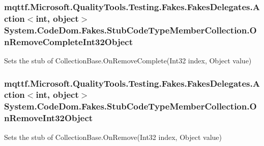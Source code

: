 \hypertarget{class_system_1_1_code_dom_1_1_fakes_1_1_stub_code_type_member_collection_a66573f67624ca9a5a2daddce894c0578}{
\subsubsection[{On\-Remove\-Complete\-Int32\-Object}]{\setlength{\rightskip}{0pt plus 5cm}mqttf.\-Microsoft.\-Quality\-Tools.\-Testing.\-Fakes.\-Fakes\-Delegates.\-Action$<$int, object$>$ System.\-Code\-Dom.\-Fakes.\-Stub\-Code\-Type\-Member\-Collection.\-On\-Remove\-Complete\-Int32\-Object}}\label{class_system_1_1_code_dom_1_1_fakes_1_1_stub_code_type_member_collection_a66573f67624ca9a5a2daddce894c0578}


Sets the stub of Collection\-Base.\-On\-Remove\-Complete(\-Int32 index, Object value)

\hypertarget{class_system_1_1_code_dom_1_1_fakes_1_1_stub_code_type_member_collection_a02981116075da1f75d5d2f35b8fab375}{
\subsubsection[{On\-Remove\-Int32\-Object}]{\setlength{\rightskip}{0pt plus 5cm}mqttf.\-Microsoft.\-Quality\-Tools.\-Testing.\-Fakes.\-Fakes\-Delegates.\-Action$<$int, object$>$ System.\-Code\-Dom.\-Fakes.\-Stub\-Code\-Type\-Member\-Collection.\-On\-Remove\-Int32\-Object}}\label{class_system_1_1_code_dom_1_1_fakes_1_1_stub_code_type_member_collection_a02981116075da1f75d5d2f35b8fab375}


Sets the stub of Collection\-Base.\-On\-Remove(\-Int32 index, Object value)

